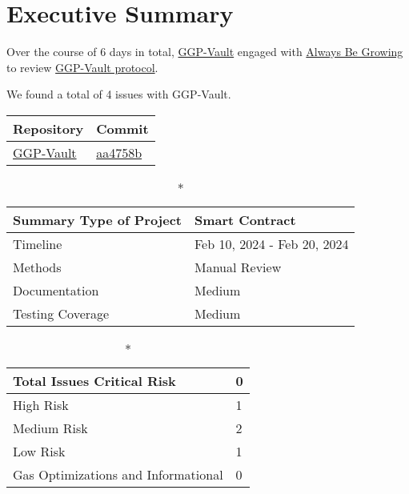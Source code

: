 \hypertarget{executive-summary}{%
\section{Executive Summary}\label{executive-summary}}

Over the course of 6 days in total, \href{https://protocolname.come}{GGP-Vault} engaged with
\href{https://abg.garden}{Always Be Growing} to review
\href{https://github.com/SeaFi-Labs/GGP-Vault}{GGP-Vault protocol}. 

We found a total of 4 issues with GGP-Vault. 

\begin{longtable}[c]{|l|l|}
\hline \textbf{Repository} & \textbf{Commit} \\

\hline
\href{https://github.com/SeaFi-Labs/GGP-Vault}{GGP-Vault} &
\href{https://github.com/SeaFi-Labs/GGP-Vault/commit/aa4758be11f4e0d139f2bfaecdd43e19bde25f26}{aa4758b} \\
\hline
\end{longtable}

\begin{longtable}[]{|l|l|}

\caption*{\textbf{Summary}}
\hline Type of Project & Smart Contract \\   
\hline Timeline & Feb 10, 2024 - Feb 20, 2024   \\
\hline Methods & Manual Review \\
\hline Documentation & Medium \\
\hline Testing Coverage & Medium  \\
\hline
\end{longtable}


\begin{longtable}[]{|l|l|}
\caption*{\textbf{Total Issues}}
\hline Critical Risk & 0 \\
\hline High Risk & 1 \\
\hline Medium Risk & 2 \\ 
\hline Low Risk & 1 \\
\hline Gas Optimizations and Informational & 0 \\
\hline
\end{longtable}

